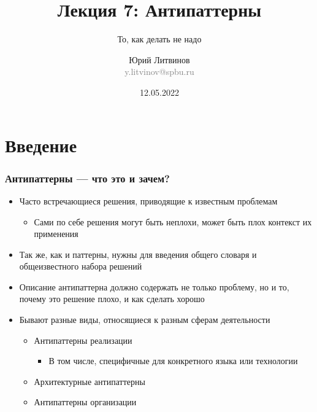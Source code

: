 \documentclass[xetex,mathserif,serif]{beamer}
\title{Лекция 7: Антипаттерны}
\subtitle{То, как делать не надо}
\author[Юрий Литвинов]{Юрий Литвинов\\\small{\textcolor{gray}{y.litvinov@spbu.ru}}}
\date{12.05.2022}
\begin{document}
    
    \frame{\titlepage}

    \section{Введение}

    \begin{frame}
        \frametitle{Антипаттерны --- что это и зачем?}
        \begin{itemize}
            \item Часто встречающиеся решения, приводящие к известным проблемам
            \begin{itemize}
                \item Сами по себе решения могут быть неплохи, может быть плох контекст их применения
            \end{itemize}
            \item Так же, как и паттерны, нужны для введения общего словаря и общеизвестного набора решений
            \item Описание антипаттерна должно содержать не только проблему, но и то, почему это решение плохо, и как сделать хорошо
            \item Бывают разные виды, относящиеся к разным сферам деятельности
            \begin{itemize}
                \item Антипаттерны реализации
                \begin{itemize}
                    \item В том числе, специфичные для конкретного языка или технологии
                \end{itemize}
                \item Архитектурные антипаттерны
                \item Антипаттерны организации
            \end{itemize}
        \end{itemize}
    \end{frame}
\end{document}
